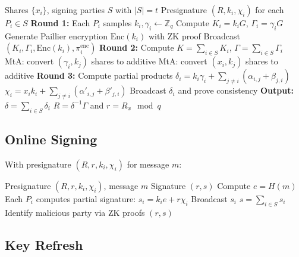 \documentclass[11pt,a4paper]{article}
\theoremstyle{definition}
\begin{document}
\begin{algorithm}
\caption{CGGMP21 Presignature Generation}
\begin{algorithmic}[1]
\Require Shares $\{x_i\}$, signing parties $S$ with $|S| = t$
\Ensure Presignature $(R, k_i, \chi_i)$ for each $P_i \in S$
\State \textbf{Round 1:} Each $P_i$ samples $k_i, \gamma_i \leftarrow \mathbb{Z}_q$
\State Compute $K_i = k_i G$, $\Gamma_i = \gamma_i G$
\State Generate Paillier encryption $\text{Enc}(k_i)$ with ZK proof
\State Broadcast $(K_i, \Gamma_i, \text{Enc}(k_i), \pi_i^{\text{enc}})$
\State \textbf{Round 2:} Compute $K = \sum_{i \in S} K_i$, $\Gamma = \sum_{i \in S} \Gamma_i$
    \State MtA: convert $(\gamma_i, k_j)$ shares to additive
    \State MtA: convert $(x_i, k_j)$ shares to additive
\EndFor
\State \textbf{Round 3:} Compute partial products
\State $\delta_i = k_i \gamma_i + \sum_{j \neq i} (\alpha_{i,j} + \beta_{j,i})$ 
\State $\chi_i = x_i k_i + \sum_{j \neq i} (\alpha'_{i,j} + \beta'_{j,i})$ 
\State Broadcast $\delta_i$ and prove consistency
\State \textbf{Output:}
\State $\delta = \sum_{i \in S} \delta_i$
\State $R = \delta^{-1} \Gamma$ and $r = R_x \mod q$
\end{algorithmic}
\end{algorithm}

\subsection{Online Signing}

With presignature $(R, r, k_i, \chi_i)$ for message $m$:

\begin{algorithm}
\caption{CGGMP21 Online Signing}
\begin{algorithmic}[1]
\Require Presignature $(R, r, k_i, \chi_i)$, message $m$
\Ensure Signature $(r, s)$
\State Compute $e = H(m)$
\State Each $P_i$ computes partial signature: $s_i = k_i e + r \chi_i$
\State Broadcast $s_i$
\State $s = \sum_{i \in S} s_i$
    \State Identify malicious party via ZK proofs
\EndIf
\State \Return $(r, s)$
\end{algorithmic}
\end{algorithm}

\subsection{Key Refresh}
\end{document}
